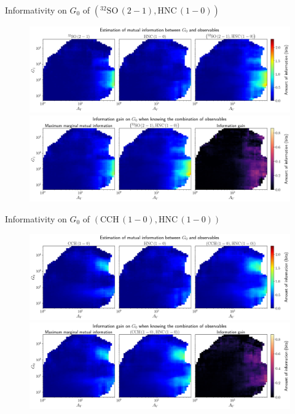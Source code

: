 \documentclass{beamer}
\begin{document}
\begin{frame}{Informativity on $G_0$ of $\left(\mathrm{^{32}SO\,(2-1)},\mathrm{HNC\,(1-0)}\right)$}
    \begin{figure}
        \centering
        \includegraphics[width=0.95\linewidth]{../mi/g0__32so21_hnc10_mi.png}
        \vfill
        \includegraphics[width=0.95\linewidth]{../mi/g0__32so21_hnc10_mi_gain.png}
    \end{figure}
\end{frame}

\begin{frame}{Informativity on $G_0$ of $\left(\mathrm{CCH\,(1-0)},\mathrm{HNC\,(1-0)}\right)$}
    \begin{figure}
        \centering
        \includegraphics[width=0.95\linewidth]{../mi/g0__cch10_hnc10_mi.png}
        \vfill
        \includegraphics[width=0.95\linewidth]{../mi/g0__cch10_hnc10_mi_gain.png}
    \end{figure}
\end{frame}
\end{document}
